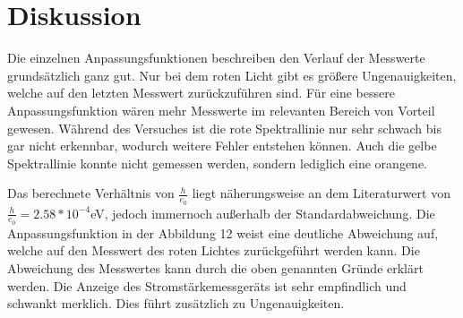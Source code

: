 \section{Diskussion}
\label{sec:Diskussion}


Die einzelnen Anpassungsfunktionen beschreiben den Verlauf der Messwerte grundsätzlich ganz gut. Nur bei dem
roten Licht gibt es größere Ungenauigkeiten, welche auf den letzten Messwert zurückzuführen sind. Für eine
bessere Anpassungsfunktion wären mehr Messwerte im relevanten Bereich von Vorteil gewesen. Während des Versuches ist
die rote Spektrallinie nur sehr schwach bis gar nicht erkennbar, wodurch weitere Fehler entstehen können.
Auch die gelbe Spektrallinie konnte nicht gemessen werden, sondern lediglich eine orangene.


Das berechnete Verhältnis von $\frac{h}{e_0}$ liegt näherungsweise an dem Literaturwert von $\frac{h}{e_0} = 2.58 *10^{-4}$eV, jedoch
immernoch außerhalb der Standardabweichung. Die Anpassungsfunktion in der Abbildung 12 weist eine deutliche Abweichung auf,
welche auf den Messwert des roten Lichtes zurückgeführt werden kann. Die Abweichung des Messwertes kann durch die oben
genannten Gründe erklärt werden.
Die Anzeige des Stromstärkemessgeräts ist sehr empfindlich und schwankt merklich. Dies führt zusätzlich zu Ungenauigkeiten.
